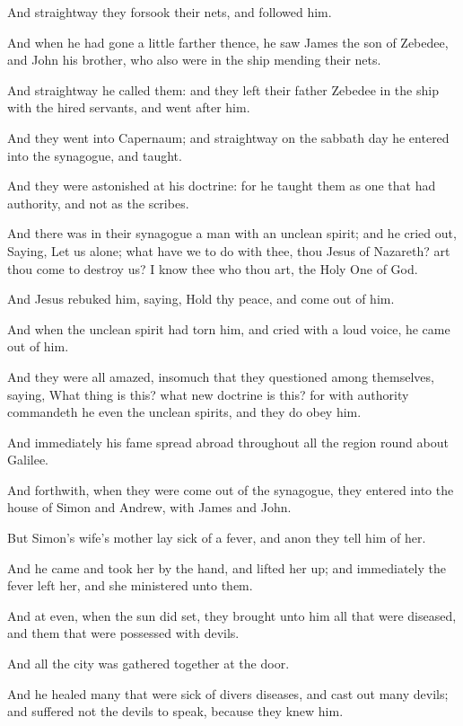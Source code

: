 \verse And straightway they forsook their nets, and followed him.

\verse And when he had gone a little farther thence, he saw James the son of Zebedee, and John his brother, who also were in the ship mending their nets.

\verse And straightway he called them: and they left their father Zebedee in the ship with the hired servants, and went after him.

\verse And they went into Capernaum; and straightway on the sabbath day he entered into the synagogue, and taught.

\verse And they were astonished at his doctrine: for he taught them as one that had authority, and not as the scribes.

\verse And there was in their synagogue a man with an unclean spirit; and he cried out, \verse Saying, Let us alone; what have we to do with thee, thou Jesus of Nazareth? art thou come to destroy us? I know thee who thou art, the Holy One of God.

\verse And Jesus rebuked him, saying, Hold thy peace, and come out of him.

\verse And when the unclean spirit had torn him, and cried with a loud voice, he came out of him.

\verse And they were all amazed, insomuch that they questioned among themselves, saying, What thing is this? what new doctrine is this? for with authority commandeth he even the unclean spirits, and they do obey him.

\verse And immediately his fame spread abroad throughout all the region round about Galilee.

\verse And forthwith, when they were come out of the synagogue, they entered into the house of Simon and Andrew, with James and John.

\verse But Simon's wife's mother lay sick of a fever, and anon they tell him of her.

\verse And he came and took her by the hand, and lifted her up; and immediately the fever left her, and she ministered unto them.

\verse And at even, when the sun did set, they brought unto him all that were diseased, and them that were possessed with devils.

\verse And all the city was gathered together at the door.

\verse And he healed many that were sick of divers diseases, and cast out many devils; and suffered not the devils to speak, because they knew him.

